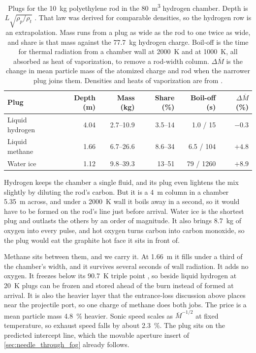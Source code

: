 \documentclass{article}
\begin{document}
\begin{table}[!htpb]
    \centering
    \caption{Plugs for the \SI{10}{\kilogram} polyethylene rod in the \SI{80}{\cubic\meter} hydrogen chamber. Depth is $L\sqrt{\rho_p/\rho_t}$ \cite{birkhoff1948lined}. That law was derived for comparable densities, so the hydrogen row is an extrapolation. Mass runs from a plug as wide as the rod to one twice as wide, and share is that mass against the \SI{77.7}{\kilogram} hydrogen charge. Boil-off is the time for thermal radiation from a chamber wall at \SI{2000}{\kelvin} and at \SI{1000}{\kelvin}, all absorbed as heat of vaporization, to remove a rod-width column. $\Delta\overline{M}$ is the change in mean particle mass of the atomized charge and rod when the narrower plug joins them. Densities and heats of vaporization are from \cite{nist_webbook_hydrogen,nist_webbook_methane,crc_handbook}.}
    \label{tab:material_chamber_plug}
    \begin{tabular}{|l|r|r|r|r|r|}\hline
        \textbf{Plug} & \textbf{Depth (\si{\meter})} & \textbf{Mass (\si{\kilogram})} & \textbf{Share (\si{\percent})} & \textbf{Boil-off (\si{\second})} & \textbf{$\Delta\overline{M}$ (\si{\percent})} \\\hline
        Liquid hydrogen & 4.04 & 2.7--10.9 & 3.5--14 & 1.0 / 15 & $-0.3$ \\\hline
        Liquid methane & 1.66 & 6.7--26.6 & 8.6--34 & 6.5 / 104 & $+4.8$ \\\hline
        Water ice & 1.12 & 9.8--39.3 & 13--51 & 79 / 1260 & $+8.9$ \\\hline
    \end{tabular}
\end{table}

Hydrogen keeps the chamber a single fluid, and its plug even lightens the mix slightly by diluting the rod's carbon. But it is a \SI{4}{\meter} column in a chamber \SI{5.35}{\meter} across, and under a \SI{2000}{\kelvin} wall it boils away in a second, so it would have to be formed on the rod's line just before arrival. Water ice is the shortest plug and outlasts the others by an order of magnitude. It also brings \SI{8.7}{\kilogram} of oxygen into every pulse, and hot oxygen turns carbon into carbon monoxide, so the plug would eat the graphite hot face it sits in front of.

Methane sits between them, and we carry it. At \SI{1.66}{\meter} it fills under a third of the chamber's width, and it survives several seconds of wall radiation. It adds no oxygen. It freezes below its \SI{90.7}{\kelvin} triple point \cite{nist_webbook_methane}, so beside liquid hydrogen at \SI{20}{\kelvin} plugs can be frozen and stored ahead of the burn instead of formed at arrival. It is also the heavier layer that the entrance-loss discussion above places near the projectile port, so one charge of methane does both jobs. The price is a mean particle mass \SI{4.8}{\percent} heavier. Sonic speed scales as $\overline{M}^{-1/2}$ at fixed temperature, so exhaust speed falls by about \SI{2.3}{\percent}. The plug sits on the predicted intercept line, which the movable aperture insert of \autoref{sec:needle_through_fog} already follows.
\end{document}
